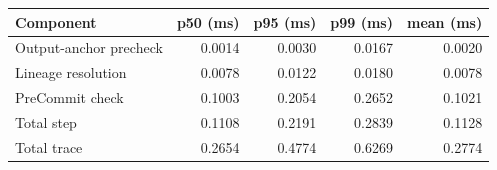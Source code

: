 \begin{tabular}{@{}lrrrr@{}}
\toprule
Component & p50 (ms) & p95 (ms) & p99 (ms) & mean (ms) \\
\midrule
Output-anchor precheck & 0.0014 & 0.0030 & 0.0167 & 0.0020 \\
Lineage resolution & 0.0078 & 0.0122 & 0.0180 & 0.0078 \\
PreCommit check & 0.1003 & 0.2054 & 0.2652 & 0.1021 \\
Total step & 0.1108 & 0.2191 & 0.2839 & 0.1128 \\
Total trace & 0.2654 & 0.4774 & 0.6269 & 0.2774 \\
\bottomrule
\end{tabular}

